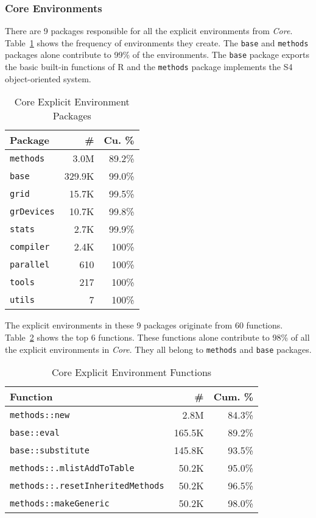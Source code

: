 \documentclass[10pt,review,sigplan,authorversion=true]{acmart}
\newcommand{\code}[1]{\lstinline |#1|\xspace}
\begin{document}
\subsubsection{Core Environments}

There are 9 packages responsible for all the explicit environments from
\emph{Core}. Table~\ref{table:core_explicit_pack} shows the frequency of
environments they create. The \code{base} and \code{methods} packages alone
contribute to 99\% of the environments. The \code{base} package exports the
basic built-in functions of R and the \code{methods} package implements the S4
object-oriented system.

\begin{table}[!h]
  \small
  \caption{Core Explicit Environment Packages} \label{table:core_explicit_pack}
  \centering
  \begin{tabular}{lrr}
    \toprule
    \textbf{Package}&\textbf{\#}&\textbf{Cu. \%}\\
    \midrule
    \code{methods}&3.0M&89.2\%\\
    \code{base}&329.9K&99.0\%\\
    \code{grid}&15.7K&99.5\%\\
    \code{grDevices}&10.7K&99.8\%\\
    \code{stats}&2.7K&99.9\%\\
    \code{compiler}&2.4K&100\%\\
    \code{parallel}&610&100\%\\
    \code{tools}&217&100\%\\
    \code{utils}&7&100\%\\
    \bottomrule
  \end{tabular}
\end{table}

The explicit environments in these 9 packages originate from 60 functions.
Table~\ref{table:core_explicit_fun} shows the top 6 functions. These functions
alone contribute to 98\% of all the explicit environments in \emph{Core}. They
all belong to \code{methods} and \code{base} packages.

\begin{table}[!h]
  \small
  \caption{Core Explicit Environment Functions} \label{table:core_explicit_fun}
  \centering
  \begin{tabular}{lrr}
    \toprule
    \textbf{Function}&\textbf{\#}&\textbf{Cum. \%}\\
    \midrule
    \code{methods::new}&2.8M&84.3\%\\
    \code{base::eval}&165.5K&89.2\%\\
    \code{base::substitute}&145.8K&93.5\%\\
    \code{methods::.mlistAddToTable}&50.2K&95.0\%\\
    \code{methods::.resetInheritedMethods}&50.2K&96.5\%\\
    \code{methods::makeGeneric}&50.2K&98.0\%\\
    \bottomrule
  \end{tabular}
\end{table}
\end{document}
